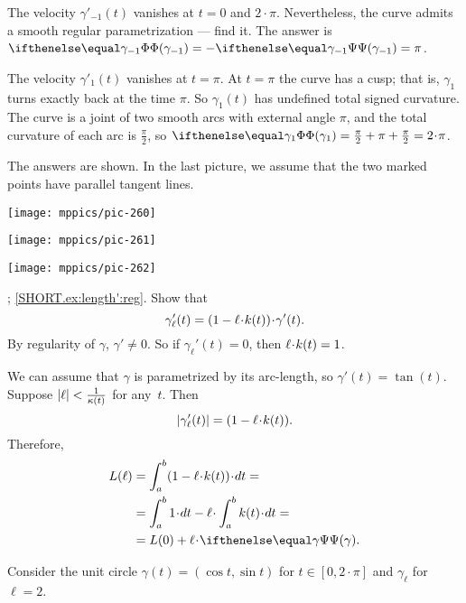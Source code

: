 \begin{multicols}{2}
The velocity $\gamma'_{-1}(t)$ vanishes at $t=0$ and $2\cdot\pi$.
Nevertheless, the curve admits a smooth regular parametrization --- find it.
The answer is $\tc{\gamma_{-1}}=-\tgc{\gamma_{-1}}=\pi$.

The velocity $\gamma'_1(t)$ vanishes at $t=\pi$.
At $t=\pi$ the curve has a cusp;
that is, $\gamma_1$ turns exactly back at the time $\pi$.
So $\gamma_1(t)$ has undefined total signed curvature.
The curve is a joint of two smooth arcs with external angle $\pi$, and
the total curvature of each arc is $\tfrac\pi2$, so 
$\tc{\gamma_{1}}=\tfrac\pi2+\pi+\tfrac\pi2=2\cdot\pi$.


The answers are shown.
In the last picture, we assume that the two marked points have parallel tangent lines.

\begin{Figure}
\begin{minipage}{.27\textwidth}
\centering
\texttt{[image: mppics/pic-260]}
\end{minipage}\hfill
\begin{minipage}{.42\textwidth}
\centering
\texttt{[image: mppics/pic-261]}
\end{minipage}
\hfill
\begin{minipage}{.27\textwidth}
\centering
\texttt{[image: mppics/pic-262]}
\end{minipage}
\end{Figure}

\parbf{\ref{ex:length'}}; \ref{SHORT.ex:length':reg}.
Show that
\[
\gamma_\ell'(t)=(1-\ell\cdot\skur(t))\cdot \gamma'(t).
\]
By regularity of $\gamma$, $\gamma'\ne0$.
So if $\gamma_\ell'(t)=0$, then $\ell\cdot \skur(t)= 1$.

 We can assume that $\gamma$ is parametrized by its arc-length, so $\gamma'(t)=\tan(t)$.
Suppose $|\ell|<\frac{1}{\kappa(t)}$ for any~$t$.
Then 
\[
|\gamma_\ell'(t)|=(1-\ell\cdot\skur(t)).
\]
Therefore,
\begin{align*}
L(\ell)
&=
\int_a^b(1-\ell\cdot\skur(t))\cdot dt=
\\&=
\int_a^b 1\cdot dt-\ell\cdot \int_a^b\skur(t)\cdot dt=
\\
&=
L(0)+\ell\cdot\tgc\gamma.
\end{align*}



Consider the unit circle $\gamma(t)=(\cos t,\sin t)$ for $t\in[0,2\cdot\pi]$ and $\gamma_\ell$ for $\ell=2$.


\end{multicols}
